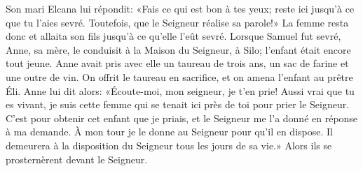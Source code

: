 Son mari Elcana lui répondit: «Fais ce qui est bon à tes yeux;
	reste ici jusqu’à ce que tu l’aies sevré.
	Toutefois, que le Seigneur réalise sa parole!»
La femme resta donc et allaita son fils jusqu’à ce qu’elle l’eût sevré.
Lorsque Samuel fut sevré,
	Anne, sa mère, le conduisit à la Maison du Seigneur, à Silo;
	l’enfant était encore tout jeune.
Anne avait pris avec elle un taureau de trois ans, un sac de farine et une outre de vin.
	On offrit le taureau en sacrifice, et on amena l’enfant au prêtre Éli.
Anne lui dit alors: «Écoute-moi, mon seigneur, je t’en prie!
	Aussi vrai que tu es vivant,
	je suis cette femme qui se tenait ici près de toi pour prier le Seigneur.
C’est pour obtenir cet enfant que je priais,
	et le Seigneur me l’a donné en réponse à ma demande.
À mon tour je le donne au Seigneur pour qu’il en dispose.
	Il demeurera à la disposition du Seigneur tous les jours de sa vie.»
Alors ils se prosternèrent devant le Seigneur.
